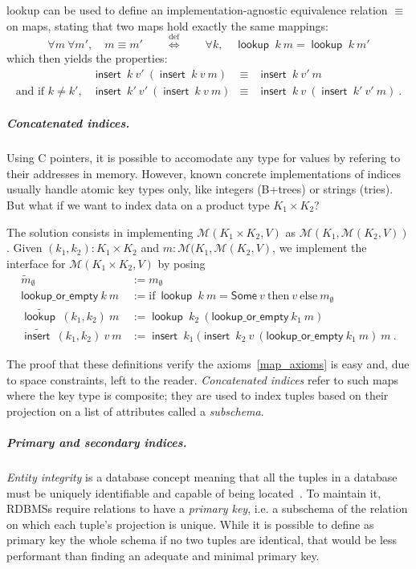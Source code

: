 \documentclass[11pt]{article}
\DeclareMathOperator{\lookup}{\mathsf{lookup}\;}
\DeclareMathOperator{\Insert}{\mathsf{insert}\;}
\begin{document}
\textsf{lookup} can be used to define an implementation-agnostic equivalence relation $\equiv$ on maps, stating that two maps hold exactly the same mappings:
\[ \forall m\ \forall m',\quad m \equiv m' \qquad \overset{\mathrm{def}}{\Leftrightarrow} \qquad \forall k,\quad \lookup k\ m = \lookup k\ m' \]
which then yields the properties:
\[\begin{array}{rrcl}
& \Insert k\ v'\ (\Insert k\ v\ m) & \equiv & \Insert k\ v'\ m \\
\text{and if } k \neq k', & \Insert k'\ v'\ (\Insert k\ v\ m) & \equiv & \Insert k\ v\ (\Insert k'\ v'\ m)\ .
\end{array}\]

\subparagraph{Concatenated indices.}
Using C pointers, it is possible to accomodate any type for values by refering to their addresses in memory.
However, known concrete implementations of indices usually handle atomic key types only, like integers (B+trees) or strings (tries).
But what if we want to index data on a product type $K_1 \times K_2$?

The solution consists in implementing $\mathcal{M}(K_1 \times K_2, V)$ as $\mathcal{M}(K_1, \mathcal{M}(K_2, V))$.
Given $(k_1, k_2): K_1 \times K_2$ and $m: \mathcal{M}(K_1, \mathcal{M}(K_2, V)$, we implement the interface for $\mathcal{M}(K_1 \times K_2, V)$ by posing
\begin{align*}
\tilde{m}_\emptyset & := m_\emptyset \\
\mathsf{lookup\_or\_empty}\ k\ m & := \mathrm{if}\ \lookup k\ m = \mathsf{Some}\ v \ \mathrm{then}\ v \ \mathrm{else}\ m_\emptyset\\
\widetilde{\lookup} (k_1, k_2)\ m & := \lookup k_2\ (\mathsf{lookup\_or\_empty}\ k_1\ m)\\
\widetilde{\Insert} (k_1, k_2)\ v\ m & := \Insert k_1\ (\Insert k_2\ v\ (\mathsf{lookup\_or\_empty}\ k_1\ m)\ m\ .
\end{align*}

The proof that these definitions verify the axioms~\eqref{map_axioms} is easy and, due to space constraints, left to the reader.
\emph{Concatenated indices} refer to such maps where the key type is composite;
they are used to index tuples based on their projection on a list of attributes called a \emph{subschema}.

\subparagraph{Primary and secondary indices.}
\emph{Entity integrity} is a database concept meaning that all the tuples in a database must be
uniquely identifiable and capable of being located~\cite{DGS}.
To maintain it, RDBMSs require relations to have a \emph{primary key},
i.e. a subschema of the relation on which each tuple's projection is unique.
While it is possible to define as primary key the whole schema if no two tuples are identical,
that would be less performant than finding an adequate and minimal primary key.
\end{document}

